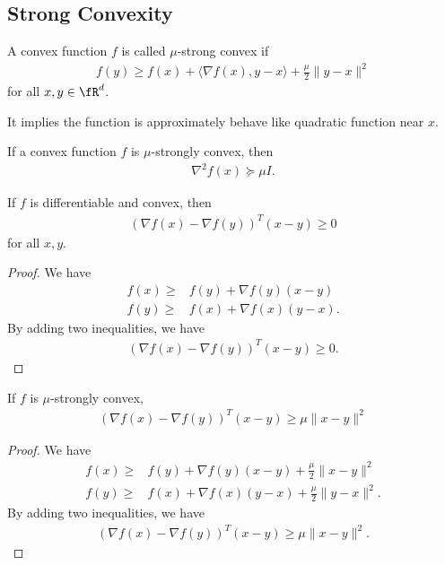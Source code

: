 \documentclass{article}
\begin{document}
\subsection{Strong Convexity}
\begin{definition}
    A convex function $f$ is called $\mu$-strong convex if
    \begin{align}
        f(y)\geq f(x) + \langle \nabla f(x), y-x\rangle + \frac{\mu}{2} \|y-x\|^2
    \end{align}
    for all $x, y\in\fR^d$.
\end{definition}
It implies the function is approximately behave like quadratic function near $x$.

\begin{theorem}
    If a convex function $f$ is $\mu$-strongly convex, then
    \begin{align}
        \nabla^2 f(x) \succeq \mu I.
    \end{align}
\end{theorem}

\begin{theorem}
    If $f$ is differentiable and convex, then
    \begin{align}
        (\nabla f(x) - \nabla f(y))^T (x-y) \geq 0
    \end{align}
    for all $x, y$.
\end{theorem}
\begin{proof}
    We have
    \begin{align}
        f(x) \geq& f(y) + \nabla f(y) (x-y)\\
        f(y) \geq& f(x) + \nabla f(x) (y-x).
    \end{align}
    By adding two inequalities, we have
    \begin{align}
        (\nabla f(x) - \nabla f(y))^T (x-y) \geq 0.
    \end{align}
\end{proof}

\begin{theorem}
    If $f$ is $\mu$-strongly convex, 
    \begin{align}
        (\nabla f(x) - \nabla f(y))^T (x-y) \geq \mu \|x-y\|^2
    \end{align}
\end{theorem}

\begin{proof}
    We have
    \begin{align}
        f(x) \geq& f(y) + \nabla f(y) (x-y) + \frac{\mu}{2} \|x-y \|^2\\
        f(y) \geq& f(x) + \nabla f(x) (y-x) + \frac{\mu}{2} \|y-x \|^2.
    \end{align}
    By adding two inequalities, we have
    \begin{align}
        (\nabla f(x) - \nabla f(y))^T (x-y) \geq \mu\|x-y\|^2.
    \end{align}
\end{proof}
\end{document}
